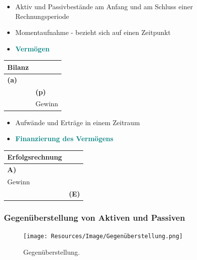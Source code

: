 \documentclass[../ZF_Wing.tex]{subfiles}
\begin{document}
\begin{multicols}{2}

\begin{itemize}
	\item Aktiv und Passivbestände am Anfang und am Schluss einer Rechnungsperiode
	\item Momentaufnahme - bezieht sich auf einen Zeitpunkt
	\item \textcolor {teal} {\textbf{Vermögen}}
\end{itemize}
\begin{table} [H]

\begin{tabular}{l|l}
\textbf{Bilanz}\\
\hline
\colorbox{pink!30}{\textbf{(a)} }

\\\hline
&\colorbox{pink!30}{\textbf{(p)} }\\
\hline
& Gewinn\\
\hline

\end{tabular}
\end{table}

\columnbreak


\begin{itemize}
	\item Aufwände und Erträge in einem Zeitraum
	\item \textcolor {teal} {\textbf{Finanzierung des Vermögens}}
\end{itemize}

\begin{table} [H]
\begin{tabular}{l|l}
\textbf{Erfolgsrechnung}\\
\hline
\colorbox{pink!30}{\textbf{A)} }
\\\hline
Gewinn \\
\hline
&\colorbox{pink!30}{\textbf{(E)} }\\
\hline
\end{tabular}
\end{table}

\end{multicols}

\subsubsection{Gegenüberstellung von Aktiven und Passiven}

\begin{figure}[H]
\centering
\texttt{[image: Resources/Image/Gegenüberstellung.png]}
\caption{\label{fig:Gegenüberstellung}Gegenüberstellung.}
\end{figure}
\end{document}
